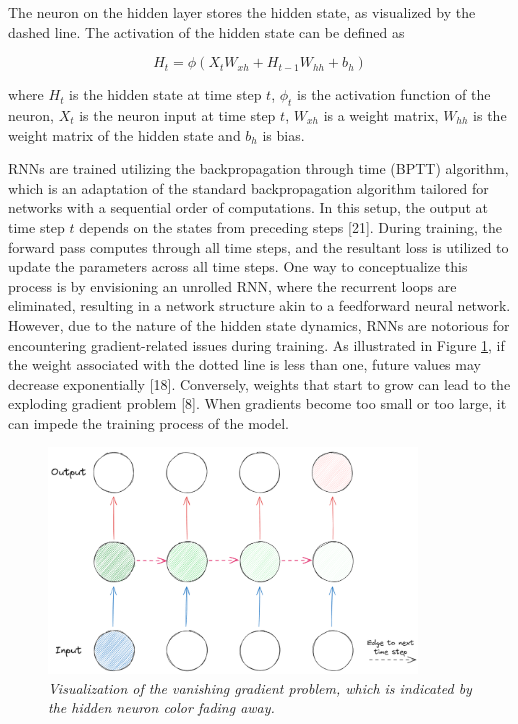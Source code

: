 The neuron on the hidden layer stores the hidden state, as visualized by the dashed
line. The activation of the hidden state can be defined as

\begin{equation}
    H_t = \phi(X_tW_{xh} + H_{t-1}W_{hh} + b_h)
\end{equation}

where \(H_t\) is the hidden state at time step \(t\), \(\phi_t\) is the activation function of the neuron, \(X_t\) is the neuron input at time step \(t\), \(W_{xh}\) is a weight matrix, \(W_{hh}\) is the weight matrix of the hidden state and \(b_h\) is bias.

RNNs are trained utilizing the backpropagation through time (BPTT) algorithm, which is an adaptation of the standard backpropagation algorithm tailored for networks with a sequential order of computations. In this setup, the output at time step \(t\) depends on the states from preceding steps [21]. During training, the forward pass computes through all time steps, and the resultant loss is utilized to update the parameters across all time steps. One way to conceptualize this process is by envisioning an unrolled RNN, where the recurrent loops are eliminated, resulting in a network structure akin to a feedforward neural network. However, due to the nature of the hidden state dynamics, RNNs are notorious for encountering gradient-related issues during training. As illustrated in Figure \ref{fig:gradient}, if the weight associated with the dotted line is less than one, future values may decrease exponentially [18]. Conversely, weights that start to grow can lead to the exploding gradient problem [8]. When gradients become too small or too large, it can impede the training process of the model.


\begin{figure}[H]
    \centering
    \includegraphics[width=\textwidth,height=6cm,keepaspectratio=true]{gradient.png}
    \caption{
        \it{Visualization of the vanishing gradient problem, which is indicated by the
            hidden neuron color fading away.}
    }
    \label{fig:gradient}
\end{figure}

